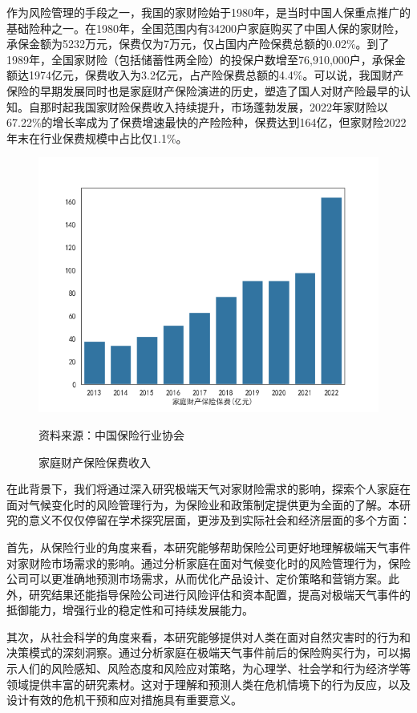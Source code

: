作为风险管理的手段之一，我国的家财险始于1980年，是当时中国人保重点推广的基础险种之一。在1980年，全国范围内有34200户家庭购买了中国人保的家财险，承保金额为5232万元，保费仅为7万元，仅占国内产险保费总额的0.02\%。到了1989年，全国家财险（包括储蓄性两全险）的投保户数增至76,910,000户，承保金额达1974亿元，保费收入为3.2亿元，占产险保费总额的4.4\%。可以说，我国财产保险的早期发展同时也是家庭财产保险演进的历史\citep{黄英君2008论我国产险公司分散性业务营销模式的创新}，塑造了国人对财产险最早的认知。自那时起我国家财险保费收入持续提升，市场蓬勃发展，2022年家财险以67.22\%的增长率成为了保费增速最快的产险险种，保费达到164亿，但家财险2022年末在行业保费规模中占比仅1.1\%。
\begin{figure}[H]
    {\centering
    \includegraphics[width=0.8\linewidth]{img/家庭财产保险保费.png}\par }
    \caption{家庭财产保险保费收入}
    资料来源：中国保险行业协会
\end{figure}

在此背景下，我们将通过深入研究极端天气对家财险需求的影响，探索个人家庭在面对气候变化时的风险管理行为，为保险业和政策制定提供更为全面的了解。本研究的意义不仅仅停留在学术探究层面，更涉及到实际社会和经济层面的多个方面：

首先，从保险行业的角度来看，本研究能够帮助保险公司更好地理解极端天气事件对家财险市场需求的影响。通过分析家庭在面对气候变化时的风险管理行为，保险公司可以更准确地预测市场需求，从而优化产品设计、定价策略和营销方案。此外，研究结果还能指导保险公司进行风险评估和资本配置，提高对极端天气事件的抵御能力，增强行业的稳定性和可持续发展能力。

其次，从社会科学的角度来看，本研究能够提供对人类在面对自然灾害时的行为和决策模式的深刻洞察。通过分析家庭在极端天气事件前后的保险购买行为，可以揭示人们的风险感知、风险态度和风险应对策略，为心理学、社会学和行为经济学等领域提供丰富的研究素材。这对于理解和预测人类在危机情境下的行为反应，以及设计有效的危机干预和应对措施具有重要意义。

